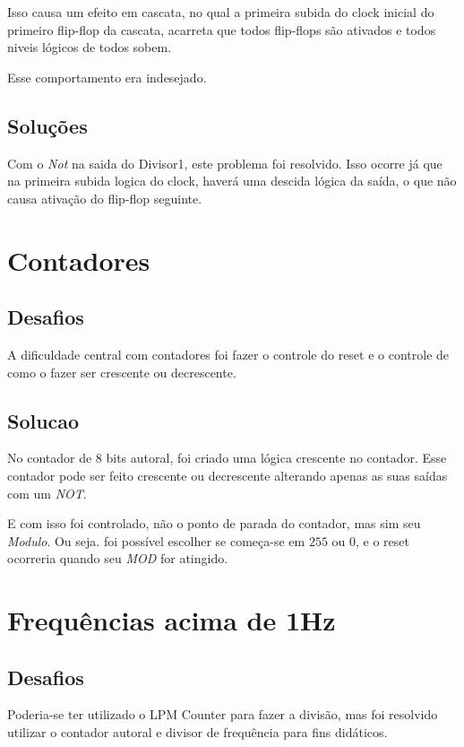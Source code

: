 Isso causa um efeito em cascata, no qual a primeira subida do clock inicial do primeiro flip-flop da cascata, acarreta que todos flip-flops são ativados e todos niveis lógicos de todos sobem.

Esse comportamento era indesejado.

\subsection{Soluções}

Com o \emph{Not} na saida do Divisor1, este problema foi resolvido. Isso ocorre já que na primeira subida logica do clock, haverá uma descida lógica da saída, o que não causa ativação do flip-flop seguinte.

\section{Contadores}

\subsection{Desafios}

A dificuldade central com contadores foi fazer o controle do reset e o controle de como o fazer ser crescente ou decrescente.

\subsection{Solucao}

No contador de 8 bits autoral, foi criado uma lógica crescente no contador. Esse contador pode ser feito crescente ou decrescente alterando apenas as suas saídas com um \emph{NOT}.

E com isso foi controlado, não o ponto de parada do contador, mas sim seu \emph{Modulo}. Ou seja. foi possível escolher se começa-se em $255$ ou $0$, e o reset ocorreria quando seu \emph{MOD} for atingido.


\section{Frequências acima de 1Hz}

\subsection{Desafios}

Poderia-se ter utilizado o LPM Counter para fazer a divisão, mas foi resolvido utilizar o contador autoral e divisor de frequência para fins didáticos.

